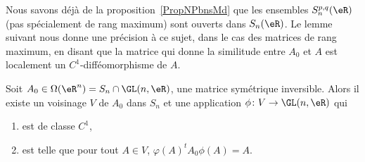 Nous savons déjà de la proposition~\ref{PropNPbnsMd} que les ensembles \( S_n^{p,q}(\eR)\) (pas spécialement de rang maximum) sont ouverts dans \( S_n(\eR)\). Le lemme suivant nous donne une précision à ce sujet, dans le cas des matrices de rang maximum, en disant que la matrice qui donne la similitude entre \( A_0\) et \( A\) est localement un \( C^1\)-difféomorphisme de \( A\).
\begin{lemma}   \label{LemWLCvLXe}
	Soit \( A_0\in \Omega(\eR^n)= S_n\cap\GL(n,\eR)\), une matrice symétrique inversible. Alors il existe un voisinage \( V\) de \( A_0\) dans \( S_n\) et une application \( \phi\colon V\to \GL(n,\eR)\) qui
	\begin{enumerate}
		\item
		      est de classe \( C^1\),
		\item
		      est telle que pour tout \( A\in V\), \( \varphi(A)^t A_0\phi(A)=A\).
	\end{enumerate}
\end{lemma}

